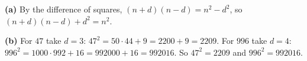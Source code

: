 \textbf{(a)} By the difference of squares, $(n+d)(n-d)=n^2-d^2$, so $(n+d)(n-d)+d^2=n^2$.

\textbf{(b)} For $47$ take $d=3$: $47^2=50\cdot44+9=2200+9=2209$. For $996$ take $d=4$: $996^2=1000\cdot992+16=992000+16=992016$. So $47^2=\boxed{2209}$ and $996^2=\boxed{992016}$.
